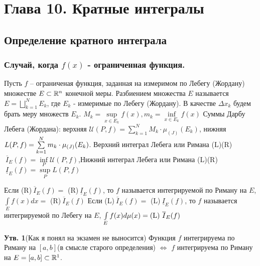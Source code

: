 \setcounter{section}{9}
\section{Глава 10. Кратные интегралы}
\subsection{Определение кратного интеграла}
\subsubsection{Случай, когда $f(x)$ - ограниченная функция.}
\begin{Def}
Пусть $f$ -- ограниченая функция, заданная на измеримом по Лебегу (Жордану) множестве $E \subset \R^n$ конечной меры. $\textbf{Разбиением}$ множества $E$ называется $E=\bigsqcup\limits_{k=1}^N E_k$, где $E_k$ - измеримые по Лебегу (Жордану). \newline В качестве $\Delta x_k$ будем брать меру множеств $E_k$. $M_k=\sup\limits_{x\in E_k} f(x), m_k=\inf\limits_{x\in E_k}f(x)$ \newline
Суммы Дарбу Лебега (Жордана): верхняя $\mathcal{U}(P, f)=\sum\limits_{k=1}^N M_k \cdot \mu_{(J)}(E_k)$, нижняя $L(P, f)\?=\sum\limits_{k=1}^N m_k \cdot \mu_{(J)}(E_k)$.
\newline Верхний интеграл Лебега или Римана (L)(R)$\ \overline{I}_E(f)=\inf\limits_P \mathcal{U}(P, f)$,\newline Нижний интеграл Лебега или Римана (L)(R)$\ \underline{I}_E(f)=\sup\limits_P L(P, f)$
\end{Def}
\begin{Def}
Если (R)$\ \overline{I}_E(f)=$ (R)$\ \underline{I}_E(f)$, то $f$ называется интегрируемой по Риману на $E$, $\int\limits_E f(x)dx=$ (R)$\ \overline{I}_E(f)$ \newline
Если (L)$\ \overline{I}_E(f)=$ (L)$\ \underline{I}_E(f)$, то $f$ называется интегрируемой по Лебегу на $E$, $\int\limits_E f(x)d\mu (x)\?= \text{(L) }\overline{I}_E(f)$
\end{Def}
\textbf{Утв. 1}(Как я понял на экзамен не выносится) Функция $f$ интегрируема по Риману на $[a,b]$(в смысле старого определения) $\Leftrightarrow$ $f$ интегрируема по Риману на $E=[a,b] \subset \R^1$.
